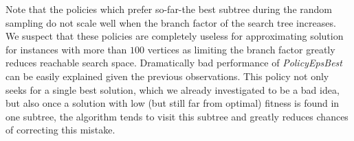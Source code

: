 Note that the policies which prefer so-far-the best subtree during the random
sampling do not scale well when the branch factor of the search tree increases.
We suspect that these policies are completely useless for approximating
solution for instances with more than $100$ vertices as limiting the branch
factor greatly reduces reachable search space. Dramatically bad performance of
\emph{PolicyEpsBest} can be easily explained given the previous observations.
This policy not only seeks for a single best solution, which we already
investigated to be a bad idea, but also once a solution with low (but still far
from optimal) fitness is found in one subtree, the algorithm tends to visit
this subtree and greatly reduces chances of correcting this mistake.
